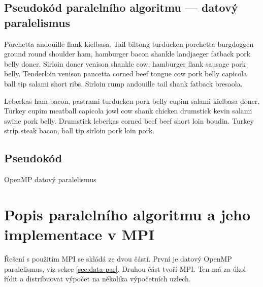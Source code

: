 \documentclass{article}
\begin{document}
    \subsection{Pseudokód paralelního algoritmu — datový paralelismus}
    Porchetta andouille flank kielbasa. Tail biltong turducken porchetta burgdoggen ground round shoulder ham, hamburger bacon shankle landjaeger fatback pork belly doner. Sirloin doner venison shankle cow, hamburger flank sausage pork belly. Tenderloin venison pancetta corned beef tongue cow pork belly capicola ball tip salami short ribs. Sirloin rump andouille tail shank fatback bresaola.

    Leberkas ham bacon, pastrami turducken pork belly cupim salami kielbasa doner. Turkey cupim meatball capicola jowl cow shank chicken drumstick kevin salami swine pork belly. Drumstick leberkas corned beef beef short loin boudin. Turkey strip steak bacon, ball tip sirloin pork loin pork.

    \subsection{Pseudokód}

    \begin{algorithm}[H]
        \SetAlgoLined

        \BlankLine

        \;
        \caption{OpenMP datový paralelismus}
        \label{alg:data-par}
    \end{algorithm}


    \section{Popis paralelního algoritmu a jeho implementace v MPI}

    Řešení s použitím MPI se skládá ze dvou částí. První je datový OpenMP paralelismus,
    viz sekce \ref{sec:data-par}. Druhou část tvoří MPI. Ten má za úkol řídit a distribuovat
    výpočet na několika výpočetních uzlech.
\end{document}
